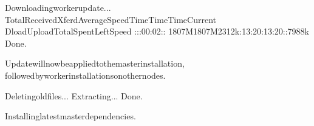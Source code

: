 \documentclass[a4paper,10pt,english]{sphinxmanual}
\begin{document}
\begin{sphinxVerbatim}[commandchars=\\\{\}]
Downloadingworkerupdate...
\PYGZpc{}Total\PYGZpc{}Received\PYGZpc{}XferdAverageSpeedTimeTimeTimeCurrent
DloadUploadTotalSpentLeftSpeed
\PYGZhy{}\PYGZhy{}:\PYGZhy{}\PYGZhy{}:\PYGZhy{}\PYGZhy{}:00:02\PYGZhy{}\PYGZhy{}:\PYGZhy{}\PYGZhy{}:\PYGZhy{}\PYGZhy{}
1807M1807M2312k:13:20:13:20\PYGZhy{}\PYGZhy{}:\PYGZhy{}\PYGZhy{}:\PYGZhy{}\PYGZhy{}7988k
Done.

Updatewillnowbeappliedtothemasterinstallation,
followedbyworkerinstallationsonothernodes.

Deletingoldfiles...
Extracting...
Done.

Installinglatestmasterdependencies.


\end{sphinxVerbatim}
\end{document}
